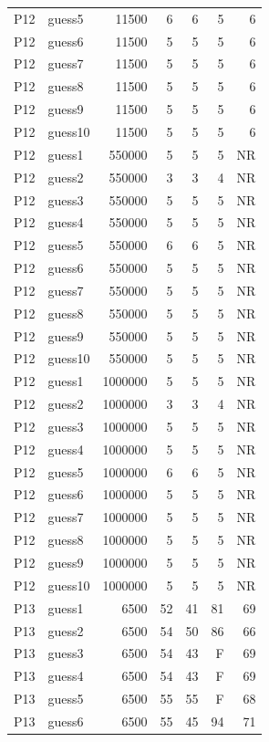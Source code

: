 {\begin{longtable}{llrrrrr}
P12 & guess5 & 11500 & 6 & 6 & 5 & 6 \\
P12 & guess6 & 11500 & 5 & 5 & 5 & 6 \\
P12 & guess7 & 11500 & 5 & 5 & 5 & 6 \\
P12 & guess8 & 11500 & 5 & 5 & 5 & 6 \\
P12 & guess9 & 11500 & 5 & 5 & 5 & 6 \\
P12 & guess10 & 11500 & 5 & 5 & 5 & 6 \\
P12 & guess1 & 550000 & 5 & 5 & 5 & NR \\
P12 & guess2 & 550000 & 3 & 3 & 4 & NR \\
P12 & guess3 & 550000 & 5 & 5 & 5 & NR \\
P12 & guess4 & 550000 & 5 & 5 & 5 & NR \\
P12 & guess5 & 550000 & 6 & 6 & 5 & NR \\
P12 & guess6 & 550000 & 5 & 5 & 5 & NR \\
P12 & guess7 & 550000 & 5 & 5 & 5 & NR \\
P12 & guess8 & 550000 & 5 & 5 & 5 & NR \\
P12 & guess9 & 550000 & 5 & 5 & 5 & NR \\
P12 & guess10 & 550000 & 5 & 5 & 5 & NR \\
P12 & guess1 & 1000000 & 5 & 5 & 5 & NR \\
P12 & guess2 & 1000000 & 3 & 3 & 4 & NR \\
P12 & guess3 & 1000000 & 5 & 5 & 5 & NR \\
P12 & guess4 & 1000000 & 5 & 5 & 5 & NR \\
P12 & guess5 & 1000000 & 6 & 6 & 5 & NR \\
P12 & guess6 & 1000000 & 5 & 5 & 5 & NR \\
P12 & guess7 & 1000000 & 5 & 5 & 5 & NR \\
P12 & guess8 & 1000000 & 5 & 5 & 5 & NR \\
P12 & guess9 & 1000000 & 5 & 5 & 5 & NR \\
P12 & guess10 & 1000000 & 5 & 5 & 5 & NR \\
P13 & guess1 & 6500 & 52 & 41 & 81 & 69 \\
P13 & guess2 & 6500 & 54 & 50 & 86 & 66 \\
P13 & guess3 & 6500 & 54 & 43 & F & 69 \\
P13 & guess4 & 6500 & 54 & 43 & F & 69 \\
P13 & guess5 & 6500 & 55 & 55 & F & 68 \\
P13 & guess6 & 6500 & 55 & 45 & 94 & 71 \\

\end{longtable}}
